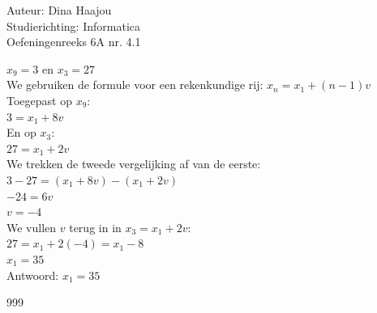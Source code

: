 \documentclass[a4paper]{article}
\begin{document}
\noindent \large Auteur: Dina Haajou \\
\noindent \large Studierichting: Informatica \\
\noindent \large Oefeningenreeks 6A nr. 4.1 \\

\medskip

\normalsize

$x_9 = 3$ en $x_3 = 27$ \\

We gebruiken de formule voor een rekenkundige rij: $x_n = x_1 + (n - 1)v$ \\

Toegepast op $x_9$: \\

$3 = x_1 + 8v$ \\

En op $x_3$: \\

$27 = x_1 + 2v$ \\

We trekken de tweede vergelijking af van de eerste: \\

$3 - 27 = (x_1 + 8v) - (x_1 + 2v)$ \\

$-24 = 6v$ \\

$v = -4$ \\

We vullen $v$ terug in in $x_3 = x_1 + 2v$: \\

$27 = x_1 + 2(-4) = x_1 - 8$ \\

$x_1 = 35$ \\

Antwoord: $x_1 = 35$

\begin{thebibliography}{999}
\end{thebibliography}
\end{document}
